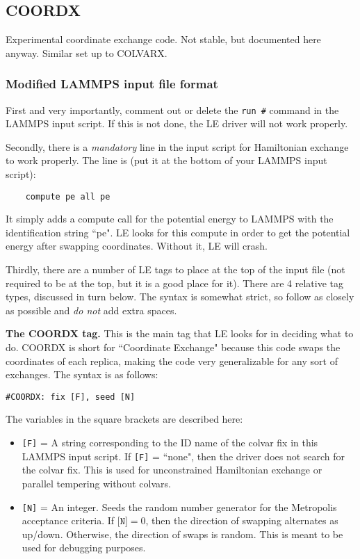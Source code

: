\documentclass[10pt]{article}
\begin{document}
\subsection{COORDX}

Experimental coordinate exchange code. Not stable, but documented here anyway. Similar set up to COLVARX.

\subsubsection{Modified LAMMPS input file format}

First and very importantly, comment out
or delete the \texttt{run \#} command in the LAMMPS input script. If this is not done,
the LE driver will not work properly. 

Secondly, there is a {\em mandatory} line in the input script for Hamiltonian exchange to work properly.
The line is (put it at the bottom of your LAMMPS input script):
\begin{verbatim}
	compute pe all pe
\end{verbatim}
It simply adds a compute call for the potential energy to LAMMPS with the identification string ``pe". LE looks
for this compute in order to get the potential energy after swapping coordinates. Without it, LE will crash.

Thirdly, there are a number of LE tags to place
at the top of the input file (not required to be at the top, but it is a good place for it). 
There are 4 relative tag types, discussed in turn below. The syntax is somewhat strict,
so follow as closely as possible and {\em do not} add extra spaces.

\textbf{The COORDX tag.}
This is the main tag that LE looks for in deciding what to do. COORDX is
short for ``Coordinate Exchange" because this code swaps the coordinates of each replica,
making the code very generalizable for any sort of exchanges.
The syntax is as follows:
\begin{verbatim}
#COORDX: fix [F], seed [N]
\end{verbatim}
The variables in the square brackets are described here:
\begin{itemize}
\item	\texttt{[F]} = A string corresponding to the ID name of the colvar fix
		in this LAMMPS input script. If \texttt{[F]} = ``none", then the driver does
		not search for the colvar fix. This is used for unconstrained Hamiltonian exchange
		or parallel tempering without colvars.
\item	\texttt{[N]} = An integer. Seeds the random number generator for the Metropolis
		acceptance criteria.
		If $\texttt{[N]} = 0$,
		then the direction of swapping alternates as up/down. Otherwise, the direction of swaps
		is random. This is meant to be used for debugging purposes.
\end{itemize}
\end{document}
